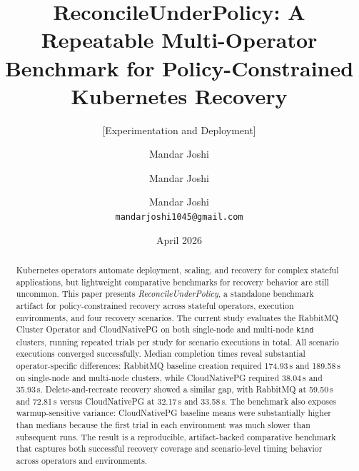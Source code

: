 \documentclass[sigconf,screen]{acmart}
\title{ReconcileUnderPolicy: A Repeatable Multi-Operator Benchmark for Policy-Constrained Kubernetes Recovery}
\subtitle{[Experimentation and Deployment]}
\author{Mandar Joshi}
\affiliation{%
        \institution{Independent Researcher}
        \city{}
        \country{India}
      }
\author{Mandar Joshi}
\affiliation{%
    \institution{Independent Researcher}
    \city{}
    \country{India}
  }
\date{}
\author{Mandar Joshi \\ \texttt{mandarjoshi1045@gmail.com}}
\date{April 2026}
\begin{document}
\ifacmformat
\begin{abstract}
Kubernetes operators automate deployment, scaling, and recovery for complex
stateful applications, but lightweight comparative benchmarks for recovery
behavior are still uncommon. This paper presents \emph{ReconcileUnderPolicy}, a
standalone benchmark artifact for policy-constrained recovery across
\RUPOperatorCount{} stateful operators, \RUPEnvironmentCount{} execution
environments, and four recovery scenarios. The current study evaluates the
RabbitMQ Cluster Operator and CloudNativePG on both single-node and multi-node
\texttt{kind} clusters, running \RUPTrialCount{} repeated trials per study for
\RUPScenarioExecutions{} scenario executions in total. All
\RUPSuccessfulScenarioExecutions{} scenario executions converged successfully.
Median completion times reveal substantial operator-specific differences:
RabbitMQ baseline creation required 174.93\,s and 189.58\,s on single-node and
multi-node clusters, while CloudNativePG required 38.04\,s and 35.93\,s.
Delete-and-recreate recovery showed a similar gap, with RabbitMQ at 59.50\,s
and 72.81\,s versus CloudNativePG at 32.17\,s and 33.58\,s. The benchmark also
exposes warmup-sensitive variance: CloudNativePG baseline means were
substantially higher than medians because the first trial in each environment
was much slower than subsequent runs. The result is a reproducible,
artifact-backed comparative benchmark that captures both successful recovery
coverage and scenario-level timing behavior across operators and environments.
\end{abstract}
\maketitle
\else
\maketitle
\end{document}
